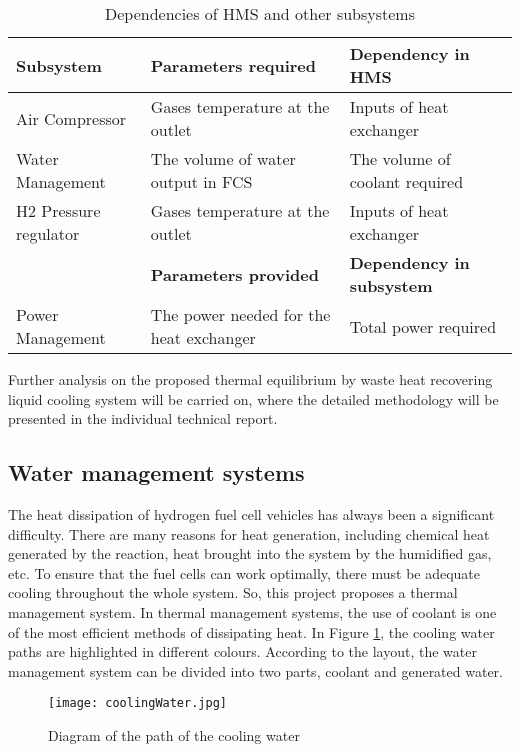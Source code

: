 \documentclass[a4paper,11pt]{article}
\begin{document}
\begin{table}[h!]
    \centering
    \begin{tabular}{|l|l|l|}%
    \hline
    \textbf{Subsystem} & \textbf{Parameters required} & \textbf{Dependency in HMS} \\ [0.5ex] 
    \hline\hline
    Air Compressor & Gases temperature at the outlet & Inputs of heat exchanger \\
    \hline
    Water Management & The volume of water output in FCS & The volume of coolant required \\
    \hline
    H2 Pressure regulator & Gases temperature at the outlet & Inputs of heat exchanger \\
    \hline
    & \textbf{Parameters provided} & \textbf{Dependency in subsystem} \\
    \hline
    Power Management & The power needed for the heat exchanger & Total power required \\
    \hline
    \end{tabular}
    \caption{Dependencies of HMS and other subsystems}
    \label{tab:subsystemDependencies}
\end{table}

Further analysis on the proposed thermal equilibrium by waste heat recovering liquid cooling system will be carried on, where the detailed methodology will be presented in the individual technical report.

\subsection{Water management systems}

The heat dissipation of hydrogen fuel cell vehicles has always been a significant difficulty. There are many reasons for heat generation, including chemical heat generated by the reaction, heat brought into the system by the humidified gas, etc. To ensure that the fuel cells can work optimally, there must be adequate cooling throughout the whole system. So, this project proposes a thermal management system. In thermal management systems, the use of coolant is one of the most efficient methods of dissipating heat. In Figure \ref{fig:coolingWater}, the cooling water paths are highlighted in different colours. According to the layout, the water management system can be divided into two parts, coolant and generated water.

\begin{figure}[h]
    \texttt{[image: coolingWater.jpg]}
    \caption{Diagram of the path of the cooling water}
    \centering
    \label{fig:coolingWater}  
\end{figure}
\end{document}
